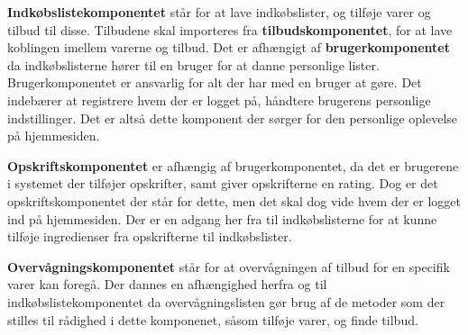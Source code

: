 \textbf{Indkøbslistekomponentet} står for at lave indkøbslister, og tilføje varer og tilbud til disse.
Tilbudene skal importeres fra \textbf{tilbudskomponentet}, for at lave koblingen imellem varerne og tilbud.
Det er afhængigt af \textbf{brugerkomponentet} da indkøbslisterne hører til en bruger for at danne personlige lister. Brugerkomponentet er ansvarlig for alt der har med en bruger at gøre. Det indebærer at registrere hvem der er logget på, håndtere brugerens personlige indstillinger. Det er altså dette komponent der sørger for den personlige oplevelse på hjemmesiden.

\textbf{Opskriftskomponentet} er afhængig af brugerkomponentet, da det er brugerene i systemet der tilføjer opskrifter, samt giver opskrifterne en rating.
Dog er det opskriftskomponentet der står for dette, men det skal dog vide hvem der er logget ind på hjemmesiden.
Der er en adgang her fra til indkøbslisterne for at kunne tilføje ingredienser fra opskrifterne til indkøbslister.

\textbf{Overvågningskomponentet} står for at overvågningen af tilbud for en specifik varer kan foregå.
Der dannes en afhængighed herfra og til indkøbslistekomponentet da overvågningslisten gør brug af de metoder som der stilles til rådighed i dette komponenet, såsom tilføje varer, og finde tilbud.



